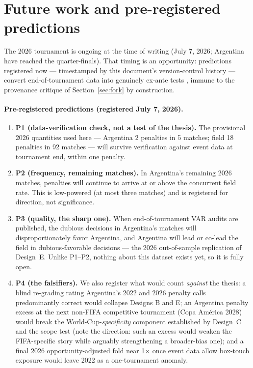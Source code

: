 \documentclass[11pt,a4paper]{article}
\begin{document}
\section{Future work and pre-registered predictions}
\label{sec:future}

The 2026 tournament is ongoing at the time of writing (July 7, 2026; Argentina have
reached the quarter-finals). That timing is an opportunity: predictions registered
now --- timestamped by this document's version-control history --- convert
end-of-tournament data into genuinely ex-ante tests \cite{nosek2018}, immune to the
provenance critique of Section~\ref{sec:fork} by construction.

\paragraph{Pre-registered predictions (registered July 7, 2026).}
\begin{enumerate}
\item \textbf{P1 (data-verification check, not a test of the thesis).} The
provisional 2026 quantities used here ---
Argentina 2 penalties in 5 matches; field 18 penalties in 92 matches --- will
survive verification against event data at tournament end, within one penalty.
\item \textbf{P2 (frequency, remaining matches).} In Argentina's remaining 2026
matches, penalties will continue to arrive at or above the concurrent field rate.
This is low-powered (at most three matches) and is registered for direction, not
significance.
\item \textbf{P3 (quality, the sharp one).} When end-of-tournament VAR audits are
published, the dubious decisions in Argentina's matches will disproportionately
favor Argentina, and Argentina will lead or co-lead the field in dubious-favorable
decisions --- the 2026 out-of-sample replication of Design~E. Unlike P1--P2, nothing
about this dataset exists yet, so it is fully open.
\item \textbf{P4 (the falsifiers).} We also register what would count \emph{against}
the thesis: a blind re-grading rating Argentina's 2022 and 2026 penalty calls
predominantly correct would collapse Designs B and E; an Argentina penalty excess at
the next non-FIFA competitive tournament (Copa Am\'erica 2028) would break the
World-Cup-\emph{specificity} component established by Design~C and the scope test
(note the direction: such an excess would weaken the FIFA-specific story while
arguably strengthening a broader-bias one); and a final 2026
opportunity-adjusted fold near 1$\times$ once event data allow box-touch exposure
would leave 2022 as a one-tournament anomaly.
\end{enumerate}
\end{document}
